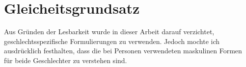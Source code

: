 
\chapter*{Gleicheitsgrundsatz}
Aus Gründen der Lesbarkeit wurde in dieser Arbeit darauf verzichtet, geschlechtsspezifische Formulierungen zu verwenden. Jedoch mochte ich ausdrücklich
festhalten, dass die bei Personen verwendeten maskulinen Formen für beide Geschlechter zu verstehen sind.\\
